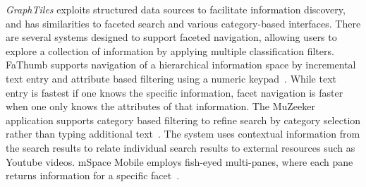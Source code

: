 


\textit{GraphTiles} exploits structured data sources to facilitate information discovery, and has similarities to faceted search and various category-based interfaces. There are several systems designed to support faceted navigation, allowing users to explore a collection of information by applying multiple classification filters. FaThumb supports navigation of a hierarchical information space by incremental text entry and attribute based filtering using a numeric keypad~\cite{Karlson:2006}. While text entry is fastest if one knows the specific information, facet navigation is faster when one only knows the attributes of that information. The MuZeeker application supports category based filtering to refine search by category selection rather than typing additional text~\cite{Larsen:2010}. The system uses contextual information from the search results to relate individual search results to external resources such as Youtube videos. mSpace Mobile employs fish-eyed multi-panes, where each pane returns information for a specific facet~\cite{mspace}.


